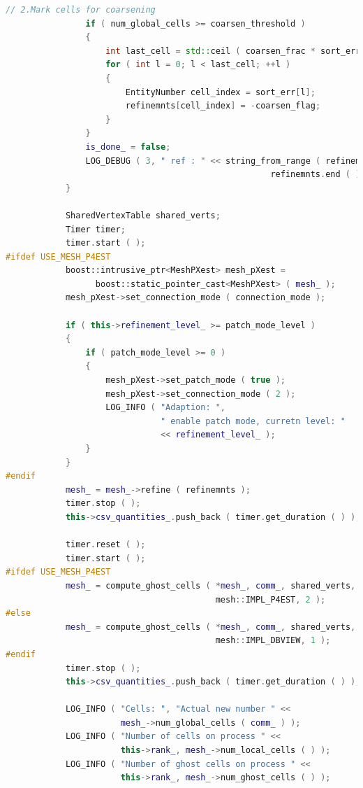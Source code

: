 \documentclass[a4paper, 11pt, twoside]{article}
\begin{document}
\begin{lstlisting}[language=C++, basicstyle={\footnotesize, \ttfamily}, keywordstyle=\color{blue}, numbers=none, tabsize=4]
                // 2.Mark cells for coarsening
                if ( num_global_cells >= coarsen_threshold )
                {
                    int last_cell = std::ceil ( coarsen_frac * sort_err.size ( ) );
                    for ( int l = 0; l < last_cell; ++l )
                    {
                        EntityNumber cell_index = sort_err[l];
                        refinemnts[cell_index] = -coarsen_flag;
                    }
                }
                is_done_ = false;
                LOG_DEBUG ( 3, " ref : " << string_from_range ( refinemnts.begin ( ), 
                                                     refinemnts.end ( ) ) );
            }

            SharedVertexTable shared_verts;
            Timer timer;
            timer.start ( );
#ifdef USE_MESH_P4EST
            boost::intrusive_ptr<MeshPXest> mesh_pXest = 
                  boost::static_pointer_cast<MeshPXest> ( mesh_ );
            mesh_pXest->set_connection_mode ( connection_mode );

            if ( this->refinement_level_ >= patch_mode_level )
            {
                if ( patch_mode_level >= 0 )
                {
                    mesh_pXest->set_patch_mode ( true );
                    mesh_pXest->set_connection_mode ( 2 );
                    LOG_INFO ( "Adaption: ", 
                               " enable patch mode, curretn level: " 
                               << refinement_level_ );
                }
            }
#endif
            mesh_ = mesh_->refine ( refinemnts );
            timer.stop ( );
            this->csv_quantities_.push_back ( timer.get_duration ( ) );

            timer.reset ( );
            timer.start ( );
#ifdef USE_MESH_P4EST
            mesh_ = compute_ghost_cells ( *mesh_, comm_, shared_verts, 
                                          mesh::IMPL_P4EST, 2 );
#else
            mesh_ = compute_ghost_cells ( *mesh_, comm_, shared_verts, 
                                          mesh::IMPL_DBVIEW, 1 );
#endif
            timer.stop ( );
            this->csv_quantities_.push_back ( timer.get_duration ( ) );

            LOG_INFO ( "Cells: ", "Actual new number " << 
                       mesh_->num_global_cells ( comm_ ) );
            LOG_INFO ( "Number of cells on process " << 
                       this->rank_, mesh_->num_local_cells ( ) );
            LOG_INFO ( "Number of ghost cells on process " << 
                       this->rank_, mesh_->num_ghost_cells ( ) );


\end{lstlisting}
\end{document}

